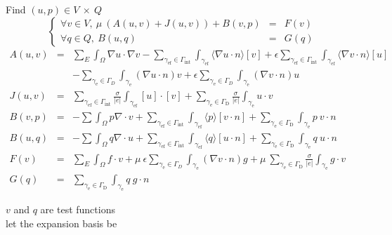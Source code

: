 \documentclass[11pt,a4paper]{article}
\begin{document}
Find $(u,p) \in V~\times~Q $ 
\vspace{-0.45cm}
$$\left\{
  \begin{array}{lcl}
   \forall v \in V,~ \mu~(A(u,v)+{J(u,v)}) + B(v,p) &=& F(v)  \\
   \forall q \in Q,~ B(u,q)  &=& G(q)
  \end{array}
 \right.$$
\vspace{-0.75cm}
\begin{eqnarray*}
A(u,v) & = & \sum\limits_E\int_\Omega \nabla u \cdot \nabla v -
\sum\limits_{\gamma_{\text{ef}} \in \Gamma_{\text{int}}} \int_{\gamma_{\text{ef}}}\langle
\nabla u \cdot n \rangle [v] + {\epsilon} \sum\limits_{\gamma_{\text{ef}} \in \Gamma_{\text{int}}} \int_{\gamma_{\text{ef}}} \langle \nabla v
\cdot n \rangle [u]\\
 && - \sum\limits_{\gamma_{\text{e}} \in \Gamma_{D}}\int_{\gamma_{\text{e}}}  (\nabla u \cdot  n)  v + {\epsilon}
\sum\limits_{\gamma_{\text{e}} \in \Gamma_{D}}\int_{\gamma_{\text{e}}} (\nabla v \cdot n) u\\
J(u,v) & = & {\sum\limits_{\gamma_{\text{ef}} \in \Gamma_{\text{int}}} \frac{\sigma}{|{e}|}\int_{\gamma_{\text{ef}}} [u] \cdot [v]} + 
{\sum\limits_{\gamma_{\text{e}} \in \Gamma_{\text{D}}} \frac{\sigma}{|{e}|}\int_{\gamma_{\text{e}}} u \cdot v}\\
B(v,p) & = & - \sum \int_\Omega p \nabla \cdot v + \sum\limits_{\gamma_{\text{ef}} \in \Gamma_{\text{int}}} \int_{\gamma_{\text{ef}}}
\langle p \rangle [v \cdot n] + \sum\limits_{\gamma_{\text{e}} \in \Gamma_{\text{D}}} \int_{\gamma_{\text{e}}} p ~ v \cdot n\\
B(u,q) & = & - \sum \int_\Omega q \nabla \cdot u + \sum\limits_{\gamma_{\text{ef}} \in \Gamma_{\text{int}}} \int_{\gamma_{\text{ef}}}
\langle q \rangle [u \cdot n]+ \sum\limits_{\gamma_{\text{e}} \in \Gamma_{\text{D}}} \int_{\gamma_{\text{e}}} q ~ u \cdot n\\
F(v) &=& \sum\limits_E \int_{\Omega} f \cdot v + \mu~{\epsilon}
\sum\limits_{\gamma_{\text{e}} \in \Gamma_{D}}\int_{\gamma_{\text{e}}} (\nabla v \cdot n) g+
\mu~{\sum\limits_{\gamma_{\text{e}} \in \Gamma_{\text{D}}} \frac{\sigma}{|{e}|}\int_{\gamma_{\text{e}}} g \cdot v}\\
G(q) &=& \sum\limits_{\gamma_{\text{e}} \in \Gamma_{\text{D}}} \int_{\gamma_{\text{e}}} q ~ g \cdot n
\end{eqnarray*}



\newpage
$v$ and $q$ are test functions\\
let the expansion basis be
\end{document}
